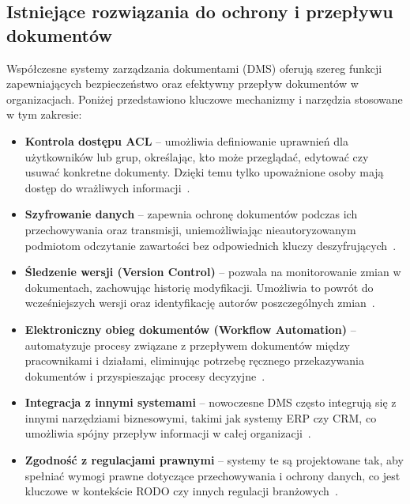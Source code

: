 \subsection{Istniejące rozwiązania do ochrony i przepływu dokumentów}

Współczesne systemy zarządzania dokumentami (DMS) oferują szereg funkcji zapewniających bezpieczeństwo oraz efektywny przepływ dokumentów w organizacjach. Poniżej przedstawiono kluczowe mechanizmy i narzędzia stosowane w tym zakresie:

\begin{itemize}
	\item \textbf{Kontrola dostępu ACL} -- umożliwia definiowanie uprawnień dla użytkowników lub grup, określając, kto może przeglądać, edytować czy usuwać konkretne dokumenty. Dzięki temu tylko upoważnione osoby mają dostęp do wrażliwych informacji~\cite{acl, acl_2}.
	
	\item \textbf{Szyfrowanie danych} -- zapewnia ochronę dokumentów podczas ich przechowywania oraz transmisji, uniemożliwiając nieautoryzowanym podmiotom odczytanie zawartości bez odpowiednich kluczy deszyfrujących~\cite{szyrowanie_danych}.

	\item \textbf{Śledzenie wersji (Version Control)} -- pozwala na monitorowanie zmian w dokumentach, zachowując historię modyfikacji. Umożliwia to powrót do wcześniejszych wersji oraz identyfikację autorów poszczególnych zmian~\cite{kotntrola_wersji}. 
	
	\item \textbf{Elektroniczny obieg dokumentów (Workflow Automation)} -- automatyzuje procesy związane z przepływem dokumentów między pracownikami i działami, eliminując potrzebę ręcznego przekazywania dokumentów i przyspieszając procesy decyzyjne~\cite{workflow_utomation}.

	\item \textbf{Integracja z innymi systemami} -- nowoczesne DMS często integrują się z innymi narzędziami biznesowymi, takimi jak systemy ERP czy CRM, co umożliwia spójny przepływ informacji w całej organizacji~\cite{dms}. 

	\item \textbf{Zgodność z regulacjami prawnymi} -- systemy te są projektowane tak, aby spełniać wymogi prawne dotyczące przechowywania i ochrony danych, co jest kluczowe w kontekście RODO czy innych regulacji branżowych~\cite{rodo_dokumenty}.
	

\end{itemize}

